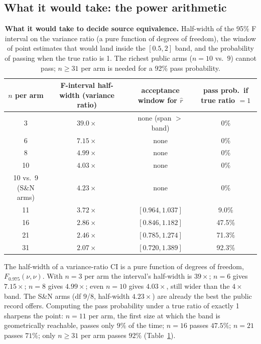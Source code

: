 \subsection{What it would take: the power arithmetic}
\label{app:t2-power}

\begin{table}[!htbp]
\centering
\caption{\textbf{What it would take to decide source equivalence.} Half-width of the 95\%
F interval on the variance ratio (a pure function of degrees of freedom), the window of point estimates that
would land inside the $[0.5,2]$ band, and the probability of passing when the true ratio is 1.
The richest public arms ($n = 10$ vs.\ $9$) cannot pass; $n \ge 31$ per arm is needed for a 92\%
pass probability.}
\label{tab:t2power}
\footnotesize
\begin{tabular}{@{}cccc@{}}
\toprule
$n$ per arm & F-interval half-width (variance ratio) & acceptance window for $\hat r$ & pass prob.\ if true ratio $= 1$ \\
\midrule
3  & $39.0\times$ & none (span $>$ band) & 0\% \\
6  & $7.15\times$ & none & 0\% \\
8  & $4.99\times$ & none & 0\% \\
10 & $4.03\times$ & none & 0\% \\
10 vs.\ 9 (S\&N arms) & $4.23\times$ & none & 0\% \\
11 & $3.72\times$ & $[0.964, 1.037]$ & 9.0\% \\
16 & $2.86\times$ & $[0.846, 1.182]$ & 47.5\% \\
21 & $2.46\times$ & $[0.785, 1.274]$ & 71.3\% \\
31 & $2.07\times$ & $[0.720, 1.389]$ & 92.3\% \\
\bottomrule
\end{tabular}
\end{table}

The half-width of a variance-ratio CI is a pure function
of degrees of freedom, $F_{0.975}(\nu,\nu)$. With $n = 3$ per arm the interval's half-width is
$39\times$; $n = 6$ gives $7.15\times$; $n = 8$ gives $4.99\times$; even $n = 10$ gives
$4.03\times$, still wider than the $4\times$ band. The S\&N arms (df 9/8, half-width $4.23\times$)
are already the best the public record offers. Computing the pass probability under a true ratio
of exactly 1 sharpens the point: $n = 11$ per arm, the first size at which the band is
geometrically reachable, passes only $9\%$ of the time; $n = 16$ passes $47.5\%$; $n = 21$
passes $71\%$; only $n \ge 31$ per arm passes $92\%$ (Table~\ref{tab:t2power}).

